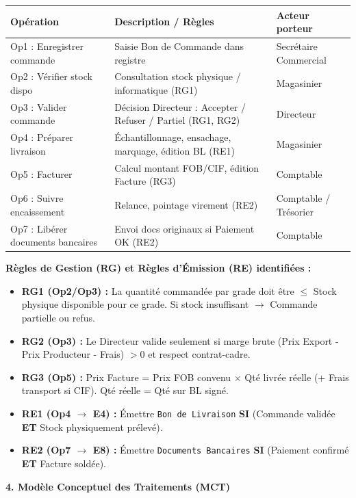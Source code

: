 \documentclass[11pt]{article}
\begin{document}
\begin{exoresolu}
\begin{center}
\begin{tabularx}{\linewidth}{|l|X|l|}
\hline
\textbf{Opération} & \textbf{Description / Règles} & \textbf{Acteur porteur} \\
\hline
Op1 : Enregistrer commande & Saisie Bon de Commande dans registre & Secrétaire Commercial \\
Op2 : Vérifier stock dispo & Consultation stock physique / informatique (RG1) & Magasinier \\
Op3 : Valider commande & Décision Directeur : Accepter / Refuser / Partiel (RG1, RG2) & Directeur \\
Op4 : Préparer livraison & Échantillonnage, ensachage, marquage, édition BL (RE1) & Magasinier \\
Op5 : Facturer & Calcul montant FOB/CIF, édition Facture (RG3) & Comptable \\
Op6 : Suivre encaissement & Relance, pointage virement (RE2) & Comptable / Trésorier \\
Op7 : Libérer documents bancaires & Envoi docs originaux si Paiement OK (RE2) & Comptable \\
\hline
\end{tabularx}
\end{center}

\textbf{Règles de Gestion (RG) et Règles d'Émission (RE) identifiées :}
\begin{itemize}
    \item \textbf{RG1 (Op2/Op3) :} La quantité commandée par grade doit être $\le$ Stock physique disponible pour ce grade. Si stock insuffisant $\to$ Commande partielle ou refus.
    \item \textbf{RG2 (Op3) :} Le Directeur valide seulement si marge brute (Prix Export - Prix Producteur - Frais) $> 0$ et respect contrat-cadre.
    \item \textbf{RG3 (Op5) :} Prix Facture = Prix FOB convenu $\times$ Qté livrée réelle (+ Frais transport si CIF). Qté réelle = Qté sur BL signé.
    \item \textbf{RE1 (Op4 $\to$ E4) :} Émettre \texttt{Bon de Livraison} \textbf{SI} (Commande validée \textbf{ET} Stock physiquement prélevé).
    \item \textbf{RE2 (Op7 $\to$ E8) :} Émettre \texttt{Documents Bancaires} \textbf{SI} (Paiement confirmé \textbf{ET} Facture soldée).
\end{itemize}

\textbf{4. Modèle Conceptuel des Traitements (MCT)}


\end{exoresolu}
\end{document}
